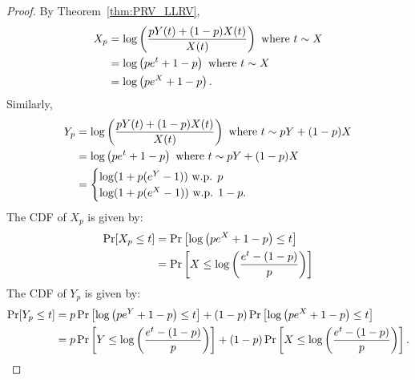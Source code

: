 \begin{proof}
By Theorem~\ref{thm:PRV_LLRV}, 
\begin{align*}
	X_p &= \log\left( \frac{pY(t)+(1-p)X(t)}{X(t)}\right) \text{ where } t\sim X\\
	& = \log \left( p e^t + 1-p\right) \text{ where } t \sim X\\
	& = \log \left( p e^X + 1-p\right).
\end{align*}
Similarly,
\begin{align*}
	Y_p &= \log\left( \frac{pY(t)+(1-p)X(t)}{X(t)}\right) \text{ where } t\sim pY+(1-p)X\\
	& = \log \left( p e^t + 1-p\right) \text{ where } t \sim pY+(1-p)X\\
	& = \begin{cases}
			\log(1+p(e^Y-1)) \text{ w.p. } p\\
			\log(1+p(e^X-1)) \text{ w.p. } 1-p.
		\end{cases} 
\end{align*}
The CDF of $X_p$ is given by:
\begin{align*}
	\Pr[X_p \le t] &= \Pr\left[ \log \left( p e^X + 1-p\right) \le t\right]\\
	&= \Pr\left[ X \le \log\left( \frac{e^t-(1-p)}{p}\right) \right]
\end{align*}
The CDF of $Y_p$ is given by:
\begin{align*}
	\Pr[Y_p \le t] &= p \Pr\left[ \log \left( p e^Y + 1-p\right) \le t\right] + (1-p) \Pr\left[ \log \left( p e^X + 1-p\right) \le t\right]\\
	&= p\Pr\left[ Y \le \log\left( \frac{e^t-(1-p)}{p}\right) \right] + (1-p)\Pr\left[ X \le \log\left( \frac{e^t-(1-p)}{p}\right) \right].
\end{align*}
\end{proof}